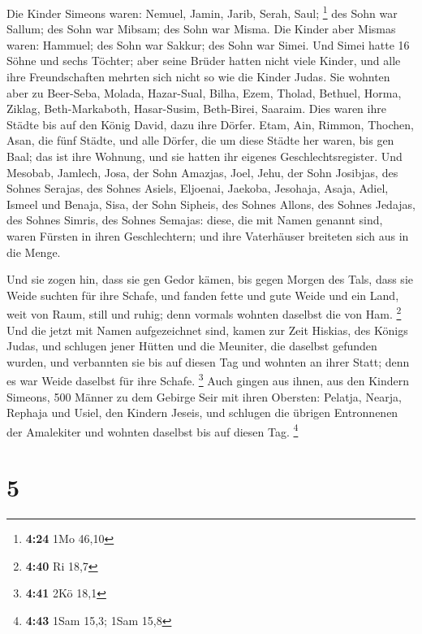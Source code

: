  Die Kinder Simeons waren: Nemuel, Jamin, Jarib, Serah,
Saul; \footnote{\textbf{4:24} 1Mo 46,10}  des Sohn war
Sallum; des Sohn war Mibsam; des Sohn war Misma.  Die
Kinder aber Mismas waren: Hammuel; des Sohn war Sakkur; des Sohn war
Simei.  Und Simei hatte 16 Söhne und sechs Töchter; aber
seine Brüder hatten nicht viele Kinder, und alle ihre Freundschaften
mehrten sich nicht so wie die Kinder Judas.  Sie wohnten
aber zu Beer-Seba, Molada, Hazar-Sual,  Bilha, Ezem,
Tholad,  Bethuel, Horma, Ziklag, 
Beth-Markaboth, Hasar-Susim, Beth-Birei, Saaraim. Dies waren ihre Städte
bis auf den König David, dazu ihre Dörfer.  Etam, Ain,
Rimmon, Thochen, Asan, die fünf Städte,  und alle Dörfer,
die um diese Städte her waren, bis gen Baal; das ist ihre Wohnung, und
sie hatten ihr eigenes Geschlechtsregister.  Und Mesobab,
Jamlech, Josa, der Sohn Amazjas,  Joel, Jehu, der Sohn
Josibjas, des Sohnes Serajas, des Sohnes Asiels, 
Eljoenai, Jaekoba, Jesohaja, Asaja, Adiel, Ismeel und Benaja,
 Sisa, der Sohn Sipheis, des Sohnes Allons, des Sohnes
Jedajas, des Sohnes Simris, des Sohnes Semajas:  diese,
die mit Namen genannt sind, waren Fürsten in ihren Geschlechtern; und
ihre Vaterhäuser breiteten sich aus in die Menge.

 Und sie zogen hin, dass sie gen Gedor kämen, bis gegen
Morgen des Tals, dass sie Weide suchten für ihre Schafe, 
und fanden fette und gute Weide und ein Land, weit von Raum, still und
ruhig; denn vormals wohnten daselbst die von Ham. \footnote{\textbf{4:40}
  Ri 18,7}  Und die jetzt mit Namen aufgezeichnet sind,
kamen zur Zeit Hiskias, des Königs Judas, und schlugen jener Hütten und
die Meuniter, die daselbst gefunden wurden, und verbannten sie bis auf
diesen Tag und wohnten an ihrer Statt; denn es war Weide daselbst für
ihre Schafe. \footnote{\textbf{4:41} 2Kö 18,1}  Auch
gingen aus ihnen, aus den Kindern Simeons, 500 Männer zu dem Gebirge
Seir mit ihren Obersten: Pelatja, Nearja, Rephaja und Usiel, den Kindern
Jeseis,  und schlugen die übrigen Entronnenen der
Amalekiter und wohnten daselbst bis auf diesen Tag. \footnote{\textbf{4:43}
  1Sam 15,3; 1Sam 15,8}

\hypertarget{section-2}{%
\section{5}\label{section-2}}

